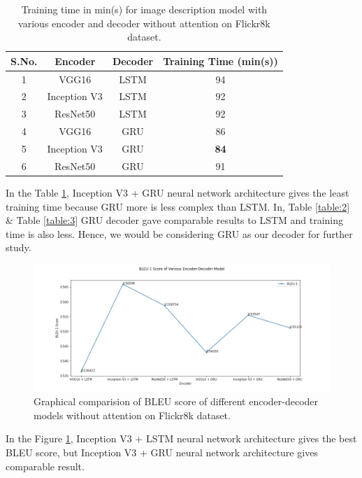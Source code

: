 \begin{table}[h!]
    \centering
    \caption{Training time in min(s) for image description model with various encoder and decoder without attention on Flickr8k dataset.}
    \begin{tabular}{ |c|c|c|c| } 
     \hline
     \textbf{S.No.} & \textbf{Encoder} & \textbf{Decoder} & \textbf{Training Time (min(s))}\\ 
     \hline
     1 & VGG16 & LSTM & 94	 \\ 
     \hline
     2 & Inception V3 & LSTM & 92 \\
     \hline
     3 & ResNet50 & LSTM & 92 \\
     \hline
     4 & VGG16 & GRU & 86	 \\
     \hline
     5 & Inception V3 & GRU & \textbf{84}	\\
     \hline
     6 & ResNet50 & GRU & 91 \\
     \hline
    \end{tabular}
    \label{table:4}
\end{table}
\newpage
\noindent In the Table \ref{table:4}, Inception V3 + GRU neural network architecture gives the least training time because GRU more is less complex than LSTM. In, Table \ref{table:2} & Table \ref{table:3} GRU decoder gave comparable results to LSTM and training time is also less. Hence, we would be considering GRU as our decoder for further study. 

\begin{figure}[ht!]
    \includegraphics[scale=0.5]{chapters/5/intfig/bleu_score.jpg}\hfill
    \caption{Graphical comparision of BLEU score of different encoder-decoder models without attention on Flickr8k dataset.}
    \label{img:graph_bleu}
\end{figure}
\noindent In the Figure \ref{img:graph_bleu}, Inception V3 + LSTM neural network architecture gives the best BLEU score, but Inception V3 + GRU neural network architecture gives comparable result.

